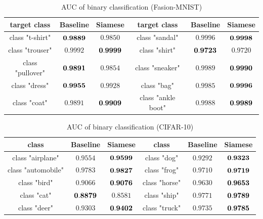 \documentclass[runningheads,a4paper]{llncs}
\begin{document}
\begin{table}[t]
\begin{center}
\caption{AUC of binary classification (Fasion-MNIST)}
\label{tabel:AUC_Fashion_binary}
\begin{tabular}{|c|c|c||c|c|c|} \hline
target class & Baseline & Siamese & target class &  Baseline & Siamese  \\ \hline \hline
class "t-shirt" &  ${\bf 0.9889}$       &     $0.9850$            &   class "sandal"        &  $0.9996$   &  ${\bf 0.9998}$   \\ \hline
class "trouser" &    $0.9992$   &         ${\bf 0.9999}$        &  class "shirt"          & ${\bf 0.9723}$   &   $0.9720$   \\ \hline
class "pullover" &    ${\bf 0.9891}$         &  $0.9854$               &  class "sneaker"          &  $0.9989$  &  ${\bf 0.9990}$    \\ \hline
class "dress" &   ${\bf 0.9955}$          &    $0.9928$            &     class "bag"      & $0.9985$       & ${\bf 0.9996}$ \\ \hline
class "coat" &   $0.9891$          &         ${\bf 0.9909}$       &    class "ankle boot"          & $0.9988$   & ${\bf0.9989}$    \\ \hline
\end{tabular}
\end{center}
\end{table}


\begin{table}[t]
\begin{center}
\caption{AUC of binary classification (CIFAR-10)}
\label{table:AUC_CIFAR10_binary}
\begin{tabular}{|c|c|c||c|c|c|} \hline
class & Baseline & Siamese & class &  Baseline & Siamese  \\ \hline \hline
class "airplane" &     $0.9554$    &     ${\bf 0.9599}$          &   class "dog"        &$0.9292$     &  ${\bf 0.9323}$  \\ \hline
class "automobile" & $0.9783$      &    ${\bf 0.9827}$          &  class "frog"          & $0.9710$   &  ${\bf 0.9719}$    \\ \hline
class "bird" &     $0.9066$        & ${\bf 0.9076}$              &  class "horse"          & $0.9630$   & ${\bf 0.9653}$    \\ \hline
class "cat" &        ${\bf 0.8879}$     &    $0.8581$            &     class "ship"      &  $0.9771$      & ${\bf 0.9789}$ \\ \hline
class "deer" &     $0.9303$        &     ${\bf 0.9402}$           &    class "truck"          &  $0.9735$  & ${\bf 0.9785}$    \\ \hline
\end{tabular}
\end{center}
\end{table}
\end{document}
